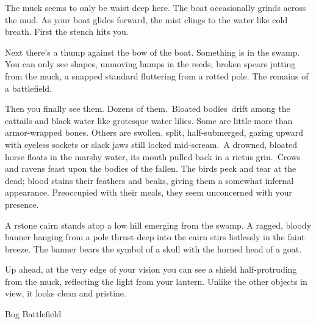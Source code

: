 \documentclass[10pt,twocolumn]{article}
\let\oldtextbf\textbf
\renewcommand{\textbf}[1]{\oldtextbf{{#1}}}
\renewenvironment{quote}
  {%
    \begingroup
      \setlength{\parindent}{1em}%
      \setlength{\parskip}{0pt}%
      \begin{tcolorbox}[myquote,
        before upper={%
          \let\textbf\oldtextbf
          \setlength{\parindent}{1.5em}%
          \setlength{\parskip}{0pt}%
          \noindent              %
        }%
      ]%
  }
  {%
      \end{tcolorbox}%
    \endgroup
  }
\begin{document}
\begin{quote}
The muck seems to only be waist deep here. The boat occasionally grinds
across the mud. As your boat glides forward, the mist clings to the
water like cold breath. First the stench hits you.~

Next there's a thump against the bow of the boat. Something is in the
swamp. You can only see shapes, unmoving humps in the reeds, broken
spears jutting from the muck, a snapped standard fluttering from a
rotted pole. The remains of a battlefield.

Then you finally see them. Dozens of them.~Bloated bodies~drift among
the cattails and black water like grotesque water lilies. Some are
little more than armor-wrapped bones. Others are swollen, split,
half-submerged, gazing upward with eyeless sockets or slack jaws still
locked mid-scream.~A drowned, bloated horse floats in the marshy water,
its mouth pulled back in a rictus grin.~Crows and ravens feast upon the
bodies of the fallen. The birds peck and tear at the dead; blood stains
their feathers and beaks, giving them a somewhat infernal appearance.
Preoccupied with their meals, they seem unconcerned with your presence.

A rstone cairn stands atop a low hill emerging from the swamp. A ragged,
bloody banner hanging from a pole thrust deep into the cairn stirs
listlessly in the faint breeze. The banner bears the symbol of a skull
with the horned head of a goat.

Up ahead, at the very edge of your vision you can see a shield
half-protruding from the muck, reflecting the light from your lantern.
Unlike the other objects in view, it looks clean and pristine.
\end{quote}

\begin{tcolorbox}[
  colback={imagecolor},
  coltext=black,
  colframe=black,
  boxrule=1pt,
  arc=6pt,
  left=4pt,
  right=4pt,
  top=2pt,
  bottom=2pt,
  boxsep=4pt,
  before skip=10pt,
  after skip=10pt,
  fontupper={\blockquoteFont\small\linespread{0.9}\selectfont\color{black}}
]

\faPhotoVideo\hspace{0.8em}\begin{minipage}[t]{\dimexpr\linewidth-1.8em\hangindent=1.8em\hangafter=0}Bog
Battlefield

\end{minipage}\end{tcolorbox}
\end{document}

